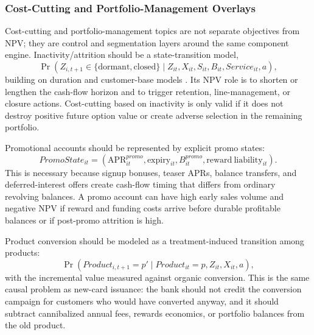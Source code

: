 \documentclass[11pt]{article}
\newcommand{\1}{\mathbf{1}}
\begin{document}
\subsubsection{Cost-Cutting and Portfolio-Management Overlays}
\label{subsec:overlays}

Cost-cutting and portfolio-management topics are not separate objectives from
NPV; they are control and segmentation layers around the same component engine.
Inactivity/attrition should be a state-transition model,
\begin{equation}
  \Pr(Z_{i,t+1}\in\{\mathrm{dormant},\mathrm{closed}\}
  \mid Z_{it},X_{it},S_{it},B_{it},Service_{it},a),
  \label{eq:attrition-hazard}
\end{equation}
building on duration and customer-base models
\citep{schmittlein1987counting,fader2005bgnbd,bolton1998duration}. Its NPV
role is to shorten or lengthen the cash-flow horizon and to trigger retention,
line-management, or closure actions. Cost-cutting based on inactivity is only
valid if it does not destroy positive future option value or create adverse
selection in the remaining portfolio.

Promotional accounts should be represented by explicit promo states:
\begin{equation}
  PromoState_{it}
  =
  (\mathrm{APR}^{promo}_{it},\mathrm{expiry}_{it},
   B^{promo}_{it},\mathrm{reward\ liability}_{it}).
  \label{eq:promo-state}
\end{equation}
This is necessary because signup bonuses, teaser APRs, balance transfers, and
deferred-interest offers create cash-flow timing that differs from ordinary
revolving balances. A promo account can have high early sales volume and
negative NPV if reward and funding costs arrive before durable profitable
balances or if post-promo attrition is high.

Product conversion should be modeled as a treatment-induced transition among
products:
\begin{equation}
  \Pr(Product_{i,t+1}=p'
    \mid Product_{it}=p,Z_{it},X_{it},a),
  \label{eq:product-conversion}
\end{equation}
with the incremental value measured against organic conversion. This is the
same causal problem as new-card issuance: the bank should not credit the
conversion campaign for customers who would have converted anyway, and it
should subtract cannibalized annual fees, rewards economics, or portfolio
balances from the old product.
\end{document}
